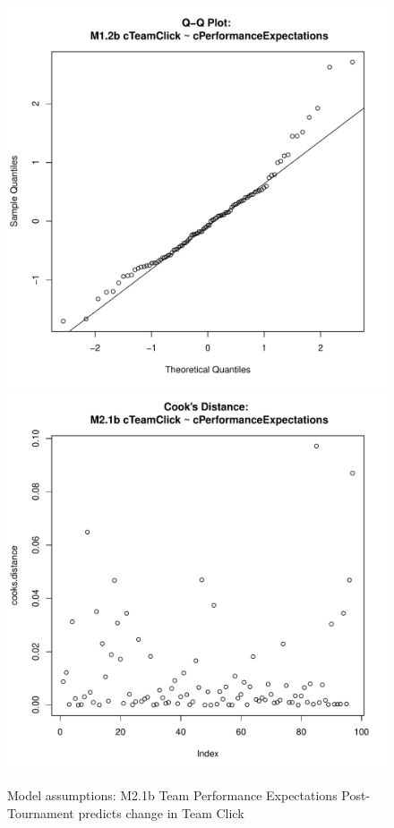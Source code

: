 \begin{figure}[htbp]
   \includegraphics[scale =.4]{images/MLM21bQQNorm.pdf}
   \includegraphics[scale =.4]{images/MLM21bCooksD.pdf}
   \caption{Model assumptions: M2.1b Team Performance Expectations Post-Tournament predicts change in Team Click}
   \label{fig:MLM21bAssumptions}
 \end{figure}


